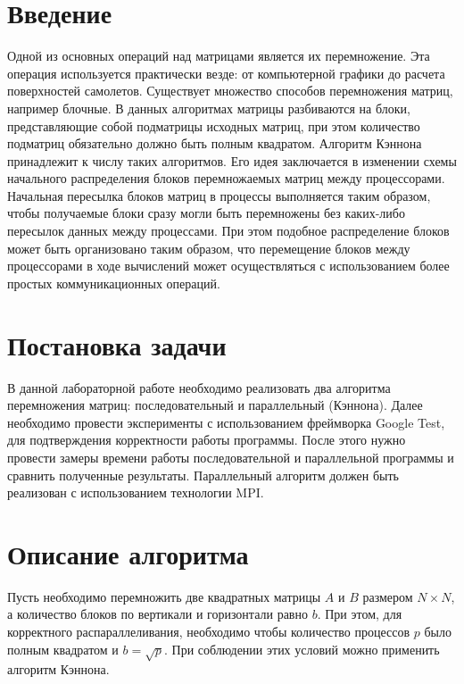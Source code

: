 \documentclass[12pt, letterpaper]{article}
\begin{document}
\section*{Введение}
\par Одной из основных операций над матрицами является их перемножение. Эта операция используется практически везде: от компьютерной графики до расчета поверхностей самолетов. Существует множество способов перемножения матриц, например блочные. В данных алгоритмах матрицы разбиваются на блоки, представляющие собой подматрицы исходных матриц, при этом количество подматриц обязательно должно быть полным квадратом. Алгоритм Кэннона принадлежит к числу таких алгоритмов. Его идея заключается в изменении схемы начального распределения блоков перемножаемых матриц между процессорами. Начальная пересылка блоков матриц в процессы выполняется таким образом, чтобы получаемые блоки сразу могли быть перемножены без каких-либо пересылок данных между процессами. При этом подобное распределение блоков может быть организовано таким образом, что перемещение блоков между процессорами в ходе вычислений может осуществляться с использованием более простых коммуникационных операций.
\newpage

\section*{Постановка задачи}
\par В данной лабораторной работе необходимо реализовать два алгоритма перемножения матриц: последовательный и параллельный (Кэннона). Далее необходимо провести эксперименты с использованием фреймворка Google Test, для подтверждения корректности работы программы. После этого нужно провести замеры времени работы последовательной и параллельной программы и сравнить полученные результаты. Параллельный алгоритм должен быть реализован с использованием технологии MPI.
\newpage

\section*{Описание алгоритма}
Пусть необходимо перемножить две квадратных матрицы $A$ и $B$ размером $N\times N$, а количество блоков по вертикали и горизонтали равно $b$. При этом, для корректного распараллеливания, необходимо чтобы количество процессов $p$ было полным квадратом и $b=\sqrt{p}$. При соблюдении этих условий можно применить алгоритм Кэннона.
\end{document}
